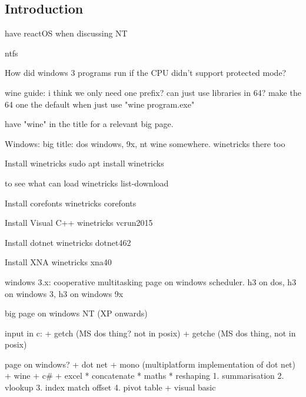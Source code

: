 
\subsection{Introduction}

have reactOS when discussing NT

ntfs

How did windows 3 programs run if the CPU didn't support protected mode?

wine guide: i think we only need one prefix? can just use libraries in 64? make the 64 one the default when just use "wine program.exe"

have "wine" in the title for a relevant big page.

Windows: big title: dos windows, 9x, nt
wine somewhere. winetricks there too

Install winetricks
sudo apt install winetricks

to see what can load
winetricks list-download

Install corefonts
winetricks corefonts

Install Visual C++
winetricks vcrun2015

Install dotnet
winetricks dotnet462

Install XNA
winetricks xna40


windows 3.x: cooperative multitasking
page on windows scheduler.
h3 on dos, h3 on windows 3, h3 on windows 9x

big page on windows NT (XP onwards)



input in c:
+ getch (MS dos thing? not in posix)
+ getche (MS dos thing, not in posix)

page on windows?
+ dot net
+ mono (multiplatform implementation of dot net)
+ wine
+ c\#
+ excel
  * concatenate
  * maths
  * reshaping
    1. summarisation
    2. vlookup
    3. index match offset
    4. pivot table
+ visual basic

